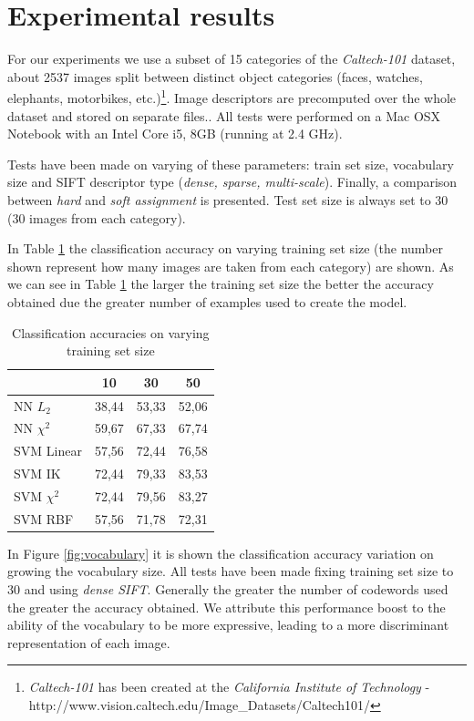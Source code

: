 \section{Experimental results}

For our experiments we use a subset of 15 categories of the \emph{Caltech-101} dataset, about 2537 images split between distinct object categories (faces, watches, elephants, motorbikes, etc.)\footnote{\emph{Caltech-101} has been created at the \emph{California Institute of Technology} - http://www.vision.caltech.edu/Image_Datasets/Caltech101/}. Image descriptors are precomputed over the whole dataset and stored on separate files.. All tests were performed on a Mac OSX Notebook with an Intel Core i5, 8GB (running at 2.4 GHz).

Tests have been made on varying of these parameters: train set size, vocabulary size and SIFT descriptor type (\emph{dense, sparse, multi-scale}). Finally, a comparison between \emph{hard} and \emph{soft assignment} is presented. Test set size is always set to 30 (30 images from each category).

In Table \ref{tab:trainsetsize} the classification accuracy on varying training set size (the number shown represent how many images are taken from each category) are shown. As we can see in Table \ref{tab:trainsetsize} the larger the training set size the better the accuracy obtained due the greater number of examples used to create the model.

\begin{table}[h]
\begin{center}
\begin{tabular}{|l|c|c|c|}
\hline
 & 10 & 30 & 50\\
\hline\hline
NN $L_2$ & 38,44 & 53,33 & 52,06\\
NN $\chi^2$ & 59,67 & 67,33 & 67,74\\
SVM Linear & 57,56 & 72,44 & 76,58\\
SVM IK & 72,44 & 79,33 & 83,53\\
SVM $\chi^2$ & 72,44 & 79,56 & 83,27\\
SVM RBF & 57,56 & 71,78 & 72,31 \\
\hline
\end{tabular}
\end{center}
\label{tab:trainsetsize}
\caption{Classification accuracies on varying training set size}
\end{table}

In Figure \ref{fig:vocabulary} it is shown the classification accuracy variation on growing the vocabulary size. All tests have been made fixing training set size to 30 and using \emph{dense SIFT}. Generally the greater the number of codewords used the greater the accuracy obtained. We attribute this performance boost to the ability of the vocabulary to be more expressive, leading to a more discriminant representation of each image.

